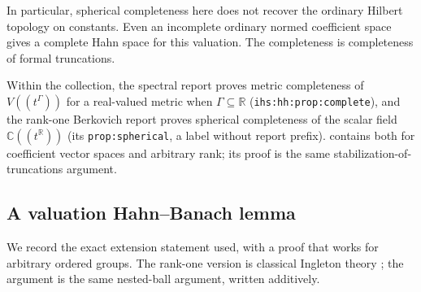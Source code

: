 \documentclass[11pt,letterpaper]{article}
\numberwithin{equation}{section}
\theoremstyle{definition}
\theoremstyle{remark}
\newcommand{\C}{\mathbb C}
\newcommand{\R}{\mathbb R}
\newcommand{\ihs}[1]{\texttt{ihs:#1}}
\newcommand{\lab}[1]{\texttt{#1}}
\begin{document}
\begin{remark}
In particular, spherical completeness here does not recover the ordinary
Hilbert topology on constants. Even an incomplete ordinary normed
coefficient space gives a complete Hahn space for this valuation. The
completeness is completeness of formal truncations.

Within the collection, the spectral report proves metric completeness of
$V((t^\Gamma))$ for a real-valued metric when $\Gamma\subseteq\R$
(\ihs{hh:prop:complete}), and the rank-one Berkovich report proves
spherical completeness of the scalar field $\C((t^\R))$ (its
\lab{prop:spherical}, a label without report prefix). 
contains both for coefficient vector spaces and arbitrary rank; its proof
is the same stabilization-of-truncations argument.
\end{remark}

\subsection{A valuation Hahn--Banach lemma}
We record the exact extension statement used, with a proof that works
for arbitrary ordered groups. The rank-one version is classical
Ingleton theory \cite{Ingleton,Morillon}; the argument is the same
nested-ball argument, written additively.
\end{document}
